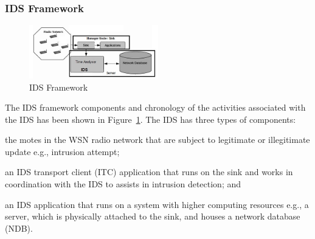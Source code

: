 \documentclass[conference]{IEEEtran}
\begin{document}
\subsubsection*{IDS Framework}
\label{ssc:ids_fw}
\begin{figure}[btp]
    \centering
    \includegraphics[width=0.5\textwidth]{IDS_fw}	
    \caption{IDS Framework}
    \label{fig:ids_fw}
\end{figure}
The IDS framework components and chronology of the activities associated with the IDS has been shown in Figure~\ref{fig:ids_fw}.
The IDS has three types of components:
\begin{inparaenum}
\item the motes in the WSN radio network that are subject to legitimate or illegitimate update e.g., intrusion attempt; 
\item an IDS transport client (ITC) application that runs on the sink and works in coordination with the IDS to assists in intrusion detection; and
\item an IDS application that runs on a system with higher computing resources e.g., a server, which is physically attached to the sink, and houses a network database (NDB).
\end{inparaenum}
\end{document}
